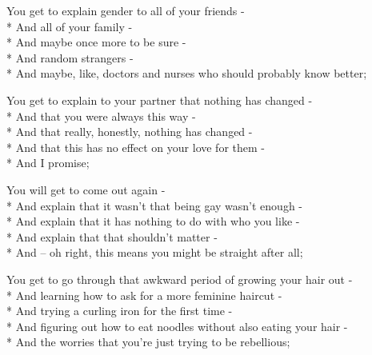 \documentclass[12pt,letterpaper,oneside]{memoir}
\begin{document}
  \pagestyle{empty}

  \vspace{1pc}
  \noindent
  You get to explain gender to all of your friends -\\*
  \hspace*{0.25cm} And all of your family -\\*
  \hspace*{0.25cm} And maybe once more to be sure -\\*
  \hspace*{0.25cm} And random strangers -\\*
  \hspace*{0.25cm} And maybe, like, doctors and nurses who should probably know better;

  \vspace{1pc}
  \noindent
  You get to explain to your partner that nothing has changed -\\*
  \hspace*{0.25cm} And that you were always this way -\\*
  \hspace*{0.25cm} And that really, honestly, nothing has changed -\\*
  \hspace*{0.25cm} And that this has no effect on your love for them -\\*
  \hspace*{0.25cm} And I promise;

  \vspace{1pc}
  \noindent
  You will get to come out again -\\*
  \hspace*{0.25cm} And explain that it wasn't that being gay wasn't enough -\\*
  \hspace*{0.25cm} And explain that it has nothing to do with who you like -\\*
  \hspace*{0.25cm} And explain that that shouldn't matter -\\*
  \hspace*{0.25cm} And -- oh right, this means you might be straight after all;

  \vspace{1pc}
  \noindent
  You get to go through that awkward period of growing your hair out -\\*
  \hspace*{0.25cm} And learning how to ask for a more feminine haircut -\\*
  \hspace*{0.25cm} And trying a curling iron for the first time -\\*
  \hspace*{0.25cm} And figuring out how to eat noodles without also eating your hair -\\*
  \hspace*{0.25cm} And the worries that you're just trying to be rebellious;
\end{document}
